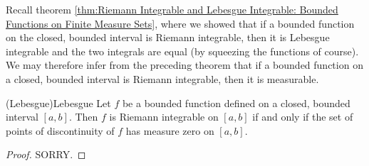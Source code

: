 \documentclass[../main.tex]{subfiles}
\begin{document}
Recall theorem \ref{thm:Riemann Integrable and Lebesgue Integrable: Bounded Functions on Finite Measure Sets}, where we showed that if a bounded function on the closed, bounded interval is Riemann integrable, then it is Lebesgue integrable and the two integrals are equal (by squeezing the functions of course). We may therefore infer from the preceding theorem that if a bounded function on a closed, bounded interval is Riemann integrable, then it is measurable.

\begin{theorem}{(Lebesgue)}{Lebesgue}
	Let $f$ be a bounded function defined on a closed, bounded interval $[a, b]$. Then $f$ is Riemann integrable on $[a, b]$ if and only if the set of points of discontinuity of $f$ has measure zero on $[a, b]$.
\end{theorem}
\begin{proof}
	SORRY.
\end{proof}
\end{document}
